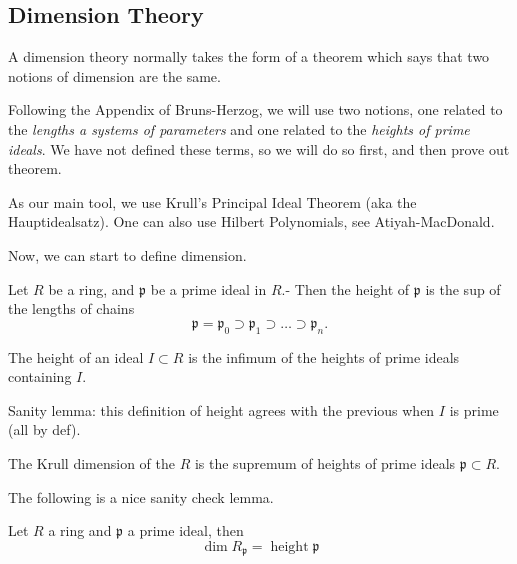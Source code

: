 \subsection{Dimension Theory}

A dimension theory normally takes the form of 
a theorem which says that two notions of dimension
are the same. 

Following the Appendix of Bruns-Herzog, we will use two 
notions, one related to the
\textit{lengths a systems of parameters} and one 
related to the \textit{heights of prime ideals}. 
We have not defined these terms, so we will do so first, and then
prove out theorem.

As our main tool, we use Krull's Principal Ideal Theorem
(aka the Hauptidealsatz). 
One can also use Hilbert Polynomials, see Atiyah-MacDonald.


Now, we can start to define dimension.

\begin{definition}
  \label{def:Ideal.primeHeight}
  \leanok
  Let $R$ be a ring, and $\mathfrak{p}$
  be a prime ideal in $R$.-
  Then the height of $\mathfrak{p}$ is the sup of
  the lengths of chains
  \[
    \mathfrak{p} = \mathfrak{p}_0 \supset \mathfrak{p}_1 \supset \dots \supset \mathfrak{p}_n
   . \]
\end{definition}


\newcommand{\height}{\operatorname{height}}


\begin{definition}
    \label{def:Ideal.height}
    \leanok
    The height of an ideal \(I \subset R\)
    is the infimum of the heights of
    prime ideals containing \(I\).
\end{definition}
    
Sanity lemma: this definition of height agrees
with the previous when \(I\) is prime (all by def).

\begin{definition}
    \label{def:krull_dim_ring}
    The Krull dimension of the \(R\)
    is the supremum of heights of prime
    ideals \(\mathfrak{p} \subset R\).
\end{definition}
    
The following is a nice sanity check lemma.
    
\begin{lemma}
    \label{lem:dim_local_eq_height_prime}
    Let \(R\) a ring and \(\mathfrak{p}\) a
    prime ideal, then
    \[
    \dim R_{\mathfrak{p}} = \height \mathfrak{p}
    \]
\end{lemma}
    
